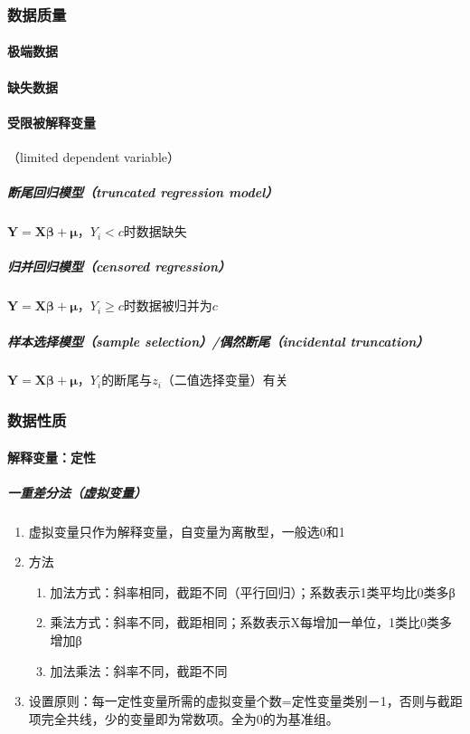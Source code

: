 \documentclass[12pt]{book}
\begin{document}
\subsubsection{数据质量}


\paragraph{极端数据}


\paragraph{缺失数据}


\paragraph{受限被解释变量}

（limited dependent variable）

\subparagraph{断尾回归模型（truncated regression model）}

$\bm{Y}=\bm{X\beta}+\bm{\mu}$，$Y_i<c$时数据缺失

\subparagraph{归并回归模型（censored regression）}

$\bm{Y}=\bm{X\beta}+\bm{\mu}$，$Y_i\geq c$时数据被归并为$c$

\subparagraph{样本选择模型（sample selection）/偶然断尾（incidental truncation）}

$\bm{Y}=\bm{X\beta}+\bm{\mu}$，$Y_i$的断尾与$z_i$（二值选择变量）有关



\subsubsection{数据性质}


\paragraph{解释变量：定性}

\subparagraph{一重差分法（虚拟变量）}


\begin{enumerate}[1.]
    \item 虚拟变量只作为解释变量，自变量为离散型，一般选0和1
    \item 方法
    \begin{enumerate}[(1)]
        \item 加法方式：斜率相同，截距不同（平行回归）；系数表示1类平均比0类多β
        \item 乘法方式：斜率不同，截距相同；系数表示X每增加一单位，1类比0类多增加β
        \item 加法乘法：斜率不同，截距不同
    \end{enumerate}
    \item 设置原则：每一定性变量所需的虚拟变量个数=定性变量类别－1，否则与截距项完全共线，少的变量即为常数项。全为0的为基准组。
\end{enumerate}
\end{document}
